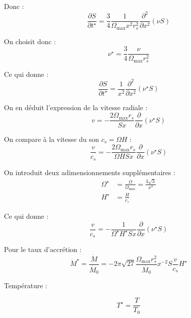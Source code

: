 Donc :
\begin{equation}
    \frac{\partial S}{\partial t^\star} = \frac{3}{4} \frac{1}{\Omega_\mathrm{max} x^2 r_s^2} \frac{\partial^2}{\partial x^2} \left(\nu S\right)
\end{equation}

On choisit donc :
\begin{equation}
    \nu^\star = \frac{3}{4} \frac{\nu}{\Omega_\mathrm{max} r_s^2}
\end{equation}

Ce qui donne :
\begin{equation}
    \frac{\partial S}{\partial t^\star} = \frac{1}{x^2} \frac{\partial^2}{\partial x^2} \left(\nu^\star S\right)
\end{equation}

On en déduit l’expression de la vitesse radiale :
\begin{equation}
    v = − \frac{2 \Omega_\mathrm{max} r_s}{S x} \frac{\partial}{\partial x} \left(\nu^\star S\right)
\end{equation}

On compare à la vitesse du son $c_s = \Omega H$ :
\begin{equation}
    \frac{v}{c_s} = − \frac{2 \Omega_\mathrm{max} r_s}{\Omega H S x} \frac{\partial}{\partial x} \left(\nu^\star S\right)
\end{equation}

On introduit deux adimensionnements supplémentaires :
\begin{align}
    \Omega^\star &= \frac{\Omega}{\Omega_\mathrm{max}} = \frac{3\sqrt{3}}{x^3} \\
    H^\star &= \frac{H}{r_s}
\end{align}

Ce qui donne :
\begin{equation}
    \frac{v}{c_s} = − \frac{1}{\Omega^\star H^\star S x} \frac{\partial}{\partial x} \left(\nu^\star S\right)
\end{equation}

Pour le taux d’accrétion :
\begin{equation}
    \dot{M}^\star = \frac{\dot{M}}{\dot{M_0}} = − 2 \pi \sqrt{27} \frac{\Omega_\mathrm{max} r_s^2}{\dot{M_0}} x^{-2} S \frac{v}{c_s} H^\star 
\end{equation}

Température :

\begin{equation}
    T^{\star} = \frac{T}{T_0}
\end{equation}


